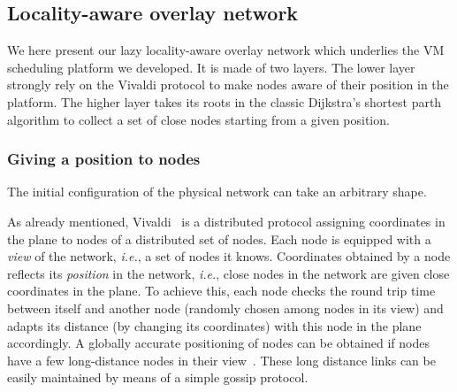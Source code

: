 

\subsection{Locality-aware  overlay network}


We here present our lazy locality-aware overlay network which underlies the VM
scheduling platform we developed. It is made of two layers. The lower layer
strongly rely on the Vivaldi protocol to make nodes aware of their position in
the platform. The higher layer takes its roots in the classic Dijkstra's
shortest parth algorithm to collect a set of close nodes starting from a given
position.


\subsubsection*{Giving a position to nodes}

The initial configuration of the physical network can take an arbitrary
shape.

As already mentioned, Vivaldi~\cite{dabek:2001:sigcomm04} is a
distributed protocol assigning coordinates in the plane to nodes of a
distributed set of nodes. Each node is equipped with a \emph{view} of the
network, \emph{i.e.}, a set of nodes it knows. Coordinates obtained by a node
reflects its \emph{position} in the network, \emph{i.e.}, close nodes in the
network are given close coordinates in the plane. To achieve this, each node
checks the round trip time between itself and another node (randomly chosen
among nodes in its view) and adapts its distance (by changing its coordinates)
with this node in the plane accordingly. %
A globally accurate positioning of nodes can be
obtained if nodes have a few long-distance nodes in their
view~\cite{dabek:2001:sigcomm04}. These long distance links can be easily
maintained by means of a simple gossip protocol.


